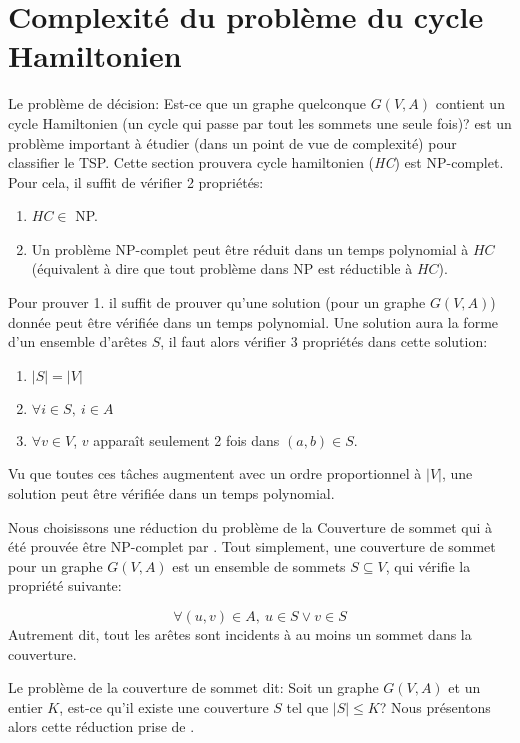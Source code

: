 \documentclass[../main.tex]{subfiles}
\begin{document}
\section{Complexité du problème du cycle Hamiltonien}
Le problème de décision: Est-ce que un graphe quelconque $G(V, A)$ contient un cycle Hamiltonien (un cycle qui passe par tout les sommets une seule fois)? est un problème important à étudier (dans un point de vue de complexité) pour classifier le TSP. Cette section prouvera cycle hamiltonien (\emph{HC}) est NP-complet. Pour cela, il suffit de vérifier 2 propriétés:

\begin{enumerate}
\item $HC \in$ NP.
\item Un problème NP-complet peut être réduit dans un temps polynomial à $HC$ (équivalent à dire que tout problème dans NP est réductible à $HC$).
\end{enumerate}

Pour prouver 1. il suffit de prouver qu'une solution (pour un graphe $G(V,A)$) donnée peut être vérifiée dans un temps polynomial. Une solution aura la forme d'un ensemble d'arêtes $S$, il faut alors vérifier 3 propriétés dans cette solution:

\begin{enumerate}
\item $|S| = |V|$
\item $\forall i \in S, \ i \in A$
\item $\forall v \in V$, $v$ apparaît seulement 2 fois dans $(a, b) \in S$. 
\end{enumerate}

Vu que toutes ces tâches augmentent avec un ordre proportionnel à $|V|$, une solution peut être vérifiée dans un temps polynomial.

Nous choisissons une réduction du problème de la \og Couverture de sommet \fg{} qui à été prouvée être NP-complet par \cite{Karp1972}. Tout simplement, une couverture de sommet pour un graphe $G(V,A)$ est un ensemble de sommets $S \subseteq V$, qui vérifie la propriété suivante:

\[
\forall (u,v) \in A, \ u \in S \lor v \in S
\]
Autrement dit, tout les arêtes sont incidents à au moins un sommet dans la couverture.

Le problème de la couverture de sommet dit: Soit un graphe $G(V,A)$ et un entier $K$, est-ce qu'il existe une couverture $S$ tel que $|S|\leq K$? Nous présentons alors cette réduction prise de \cite{Hartmanis1982}.
\end{document}
